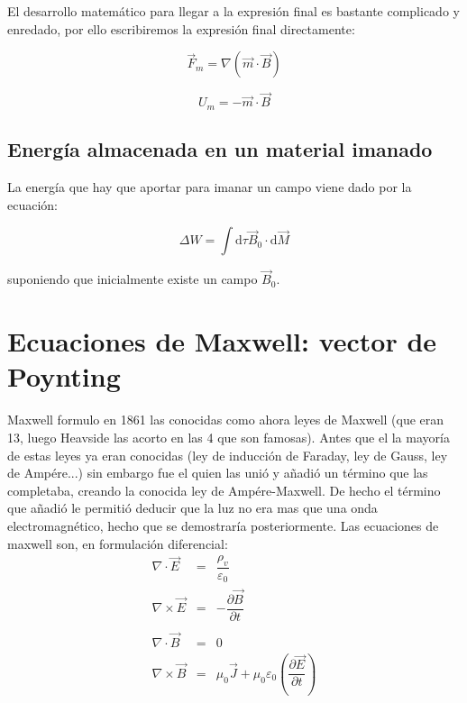 \documentclass[12pt,a4paper]{article}
\newcommand{\parentesis}[1]{\left( #1  \right)}
\newcommand{\D}{\mathrm{d}}
\begin{document}
El desarrollo matemático para llegar a la expresión final es bastante complicado y enredado, por ello escribiremos la expresión final directamente:

\begin{equation}
\vec{F}_m = \nabla (\vec{m} \cdot \vec{B}) 
\end{equation}
 
 \begin{equation}
 U_m = - \vec{m} \cdot \vec{B}
 \end{equation}
 
 
 \subsection{Energía almacenada en un material imanado}
 
 La energía que hay que aportar para imanar un campo viene dado por la ecuación:
 
 \begin{equation}
 \Delta W = \int \D \tau \vec{B}_0 \cdot \D \vec{M}
 \end{equation}

suponiendo que inicialmente existe un campo $\vec{B}_0$.
\newpage

\section{Ecuaciones de Maxwell: vector de Poynting}

Maxwell formulo en 1861 las conocidas como ahora leyes de Maxwell (que eran 13, luego Heavside las acorto en las 4 que son famosas). Antes que el la mayoría de estas leyes ya eran conocidas (ley de inducción de Faraday, ley de Gauss, ley de Ampére...) sin embargo fue el quien las unió y añadió un término que las completaba, creando la conocida ley de Ampére-Maxwell. De hecho el término que añadió le permitió deducir que la luz no era mas que una onda electromagnético, hecho que se demostraría posteriormente. Las ecuaciones de maxwell son, en formulación diferencial: \\

\begin{equation}
\begin{array}{lll}
\nabla \cdot \vec{E} & = & \dfrac{\rho_v}{\varepsilon_0} \\ 

\nabla \times \vec{E} & = & - \dfrac{\partial \vec{B}}{\partial t} \\ \\

\nabla \cdot \vec{B} & = & 0 \\ 

\nabla \times \vec{B} & = & \mu_0 \vec{J} + \mu_0 \varepsilon_0 \parentesis{\dfrac{\partial \vec{E}}{\partial t}}

\end{array}
\end{equation}
\end{document}
